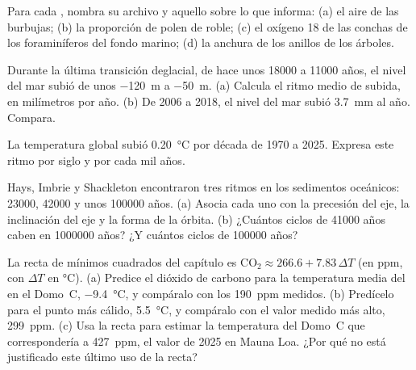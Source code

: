 \begin{exercise}[$\star$]\label{exo:g12:past-climates:2}
Para cada , nombra su archivo y aquello sobre lo que informa: (a) el aire de
las burbujas; (b) la proporción de polen de roble; (c) el oxígeno 18 de las conchas de los
foraminíferos del fondo marino; (d) la anchura de los anillos de los árboles.
\end{exercise}

\begin{exercise}[$\star$]\label{exo:g12:past-climates:3}
Durante la última transición deglacial, de hace unos \num{18000} a \num{11000}
años, el nivel del mar subió de unos \qty{-120}{m} a \qty{-50}{m}. (a) Calcula
el ritmo medio de subida, en milímetros por año. (b) De 2006 a 2018, el nivel del mar
subió \qty{3.7}{mm} al año. Compara.
\end{exercise}

\begin{exercise}[$\star$]\label{exo:g12:past-climates:4}
La temperatura global subió \qty{0.20}{\degreeCelsius} por década de
1970 a 2025. Expresa este ritmo por siglo y por cada mil años.
\end{exercise}

\begin{exercise}[$\star$]\label{exo:g12:past-climates:5}
Hays, Imbrie y Shackleton encontraron tres ritmos en los sedimentos oceánicos:
\num{23000}, \num{42000} y unos \num{100000} años. (a) Asocia cada uno con la
precesión del eje, la inclinación del eje y la forma de la órbita.
(b) ¿Cuántos ciclos de \num{41000} años caben en \num{1000000} años? ¿Y cuántos
ciclos de \num{100000} años?
\end{exercise}

\begin{exercise}[$\star\star$]\label{exo:g12:past-climates:6}
La recta de mínimos cuadrados del capítulo es $\mathrm{CO_2} \approx 266.6 +
7.83\,\Delta T$ (en ppm, con $\Delta T$ en \unit{\degreeCelsius}).
(a) Predice el dióxido de carbono para la temperatura media del  en el Domo~C, \qty{-9.4}{\degreeCelsius}, y compáralo con los
\qty{190}{ppm} medidos. (b) Predícelo para el punto más cálido, \qty{+5.5}{\degreeCelsius},
y compáralo con el valor medido más alto, \qty{299}{ppm}. (c) Usa la recta
para estimar la temperatura del Domo~C que correspondería a \qty{427}{ppm}, el
valor de 2025 en Mauna Loa. ¿Por qué no está justificado este último uso de la recta?
\end{exercise}

